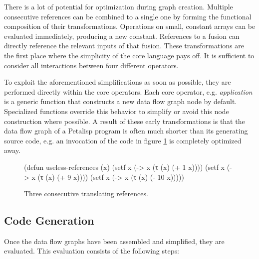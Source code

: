 There is a lot of potential for optimization during graph
creation. Multiple consecutive references can be combined to a single one
by forming the functional composition of their transformations. Operations
on small, constant arrays can be evaluated immediately, producing a new
constant. References to a fusion can directly reference the relevant inputs
of that fusion. These transformations are the first place where the
simplicity of the core language pays off. It is sufficient to consider all
interactions between four different operators.

To exploit the aforementioned simplifications as soon as possible, they are
performed directly within the core operators. Each core operator, e.g.
\emph{application} is a generic function that constructs a new data flow
graph node by default. Specialized functions override this behavior to
simplify or avoid this node construction where possible. A result of these
early transformations is that the data flow graph of a Petalisp program is
often much shorter than its generating source code, e.g. an invocation of
the code in figure \ref{fig:references} is completely optimized away.

\begin{figure}[htb]
\resetlinenumber
\begin{code}
(defun useless-references (x)
  (setf x (-> x (τ (x) (+  1 x))))
  (setf x (-> x (τ (x) (+  9 x))))
  (setf x (-> x (τ (x) (- 10 x)))))
\end{code}
\caption{Three consecutive translating references.}
\label{fig:references}
\end{figure}

\subsection{Code Generation}

Once the data flow graphs have been assembled and simplified, they are
evaluated. This evaluation consists of the following steps:

